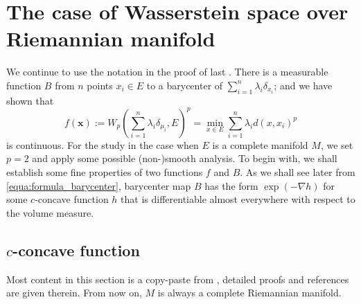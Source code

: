 \chapter{The case of Wasserstein space over Riemannian manifold}

We continue to use the notation in the proof of last .
There is a measurable function $B$ from $n$ points $x_i \in E$ to a barycenter of $\sum_{i=1}^{n} \lambda_i \delta_{x_i}$;
and we have shown that
\[f(\boldsymbol{x}) :=W_p(\sum_{i=1}^n \lambda_i \delta_{\mu_i}, E)^p =\min_{x \in E} \sum_{i=1}^n \lambda_i d(x, x_i)^p\]
is continuous.
For the study in the case when $E$ is a complete manifold $M$,
we set $p = 2$ and apply some possible (non-)smooth analysis.
To begin with, we shall establish some fine properties of two functions $f$ and $B$.
As we shall see later from \cref{equa:formula_barycenter},
barycenter map $B$
has the form $\exp( - \nabla h)$ for some $c$-concave
function $h$ that is differentiable almost everywhere with respect to the volume measure.
\section{\texorpdfstring{$c$}{c}-concave function}

Most content in this section is a copy-paste from \cite{cordero2001riemannian},
detailed proofs and references are given therein.
From now on, $M$ is always a complete Riemannian manifold.



